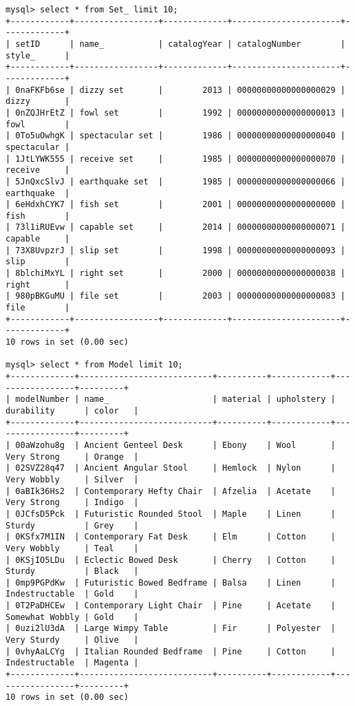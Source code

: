 \documentclass[american,extrafontsizes,12pt,portrait,letterpaper,oneside,onecolumn,article,final]{memoir}
\begin{document}
\begin{verbatim}
mysql> select * from Set_ limit 10;
+------------+-----------------+-------------+----------------------+-------------+
| setID      | name_           | catalogYear | catalogNumber        | style_      |
+------------+-----------------+-------------+----------------------+-------------+
| 0naFKFb6se | dizzy set       |        2013 | 00000000000000000029 | dizzy       |
| 0nZQJHrEtZ | fowl set        |        1992 | 00000000000000000013 | fowl        |
| 0To5uOwhgK | spectacular set |        1986 | 00000000000000000040 | spectacular |
| 1JtLYWK555 | receive set     |        1985 | 00000000000000000070 | receive     |
| 5JnQxcSlvJ | earthquake set  |        1985 | 00000000000000000066 | earthquake  |
| 6eHdxhCYK7 | fish set        |        2001 | 00000000000000000000 | fish        |
| 73l1iRUEvw | capable set     |        2014 | 00000000000000000071 | capable     |
| 73X8UvpzrJ | slip set        |        1998 | 00000000000000000093 | slip        |
| 8blchiMxYL | right set       |        2000 | 00000000000000000038 | right       |
| 980pBKGuMU | file set        |        2003 | 00000000000000000083 | file        |
+------------+-----------------+-------------+----------------------+-------------+
10 rows in set (0.00 sec)

mysql> select * from Model limit 10;
+-------------+---------------------------+----------+------------+-----------------+---------+
| modelNumber | name_                     | material | upholstery | durability      | color   |
+-------------+---------------------------+----------+------------+-----------------+---------+
| 00aWzohu8g  | Ancient Genteel Desk      | Ebony    | Wool       | Very Strong     | Orange  |
| 02SVZ28q47  | Ancient Angular Stool     | Hemlock  | Nylon      | Very Wobbly     | Silver  |
| 0aBIk36Hs2  | Contemporary Hefty Chair  | Afzelia  | Acetate    | Very Strong     | Indigo  |
| 0JCfsD5Pck  | Futuristic Rounded Stool  | Maple    | Linen      | Sturdy          | Grey    |
| 0KSfx7M1IN  | Contemporary Fat Desk     | Elm      | Cotton     | Very Wobbly     | Teal    |
| 0KSjIO5LDu  | Eclectic Bowed Desk       | Cherry   | Cotton     | Sturdy          | Black   |
| 0mp9PGPdKw  | Futuristic Bowed Bedframe | Balsa    | Linen      | Indestructable  | Gold    |
| 0T2PaDHCEw  | Contemporary Light Chair  | Pine     | Acetate    | Somewhat Wobbly | Gold    |
| 0uzi2lU3dA  | Large Wimpy Table         | Fir      | Polyester  | Very Sturdy     | Olive   |
| 0vhyAaLCYg  | Italian Rounded Bedframe  | Pine     | Cotton     | Indestructable  | Magenta |
+-------------+---------------------------+----------+------------+-----------------+---------+
10 rows in set (0.00 sec)


\end{verbatim}
\end{document}
